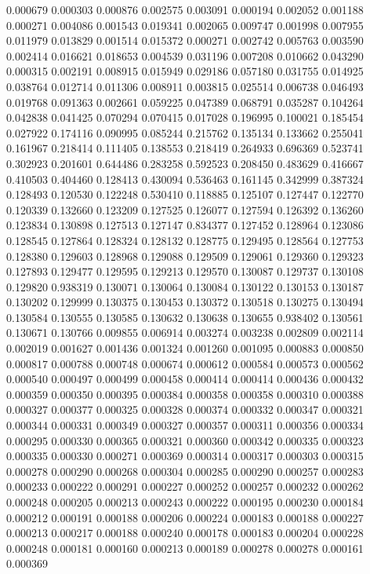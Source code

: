 0.000679
0.000303
0.000876
0.002575
0.003091
0.000194
0.002052
0.001188
0.000271
0.004086
0.001543
0.019341
0.002065
0.009747
0.001998
0.007955
0.011979
0.013829
0.001514
0.015372
0.000271
0.002742
0.005763
0.003590
0.002414
0.016621
0.018653
0.004539
0.031196
0.007208
0.010662
0.043290
0.000315
0.002191
0.008915
0.015949
0.029186
0.057180
0.031755
0.014925
0.038764
0.012714
0.011306
0.008911
0.003815
0.025514
0.006738
0.046493
0.019768
0.091363
0.002661
0.059225
0.047389
0.068791
0.035287
0.104264
0.042838
0.041425
0.070294
0.070415
0.017028
0.196995
0.100021
0.185454
0.027922
0.174116
0.090995
0.085244
0.215762
0.135134
0.133662
0.255041
0.161967
0.218414
0.111405
0.138553
0.218419
0.264933
0.696369
0.523741
0.302923
0.201601
0.644486
0.283258
0.592523
0.208450
0.483629
0.416667
0.410503
0.404460
0.128413
0.430094
0.536463
0.161145
0.342999
0.387324
0.128493
0.120530
0.122248
0.530410
0.118885
0.125107
0.127447
0.122770
0.120339
0.132660
0.123209
0.127525
0.126077
0.127594
0.126392
0.136260
0.123834
0.130898
0.127513
0.127147
0.834377
0.127452
0.128964
0.123086
0.128545
0.127864
0.128324
0.128132
0.128775
0.129495
0.128564
0.127753
0.128380
0.129603
0.128968
0.129088
0.129509
0.129061
0.129360
0.129323
0.127893
0.129477
0.129595
0.129213
0.129570
0.130087
0.129737
0.130108
0.129820
0.938319
0.130071
0.130064
0.130084
0.130122
0.130153
0.130187
0.130202
0.129999
0.130375
0.130453
0.130372
0.130518
0.130275
0.130494
0.130584
0.130555
0.130585
0.130632
0.130638
0.130655
0.938402
0.130561
0.130671
0.130766
0.009855
0.006914
0.003274
0.003238
0.002809
0.002114
0.002019
0.001627
0.001436
0.001324
0.001260
0.001095
0.000883
0.000850
0.000817
0.000788
0.000748
0.000674
0.000612
0.000584
0.000573
0.000562
0.000540
0.000497
0.000499
0.000458
0.000414
0.000414
0.000436
0.000432
0.000359
0.000350
0.000395
0.000384
0.000358
0.000358
0.000310
0.000388
0.000327
0.000377
0.000325
0.000328
0.000374
0.000332
0.000347
0.000321
0.000344
0.000331
0.000349
0.000327
0.000357
0.000311
0.000356
0.000334
0.000295
0.000330
0.000365
0.000321
0.000360
0.000342
0.000335
0.000323
0.000335
0.000330
0.000271
0.000369
0.000314
0.000317
0.000303
0.000315
0.000278
0.000290
0.000268
0.000304
0.000285
0.000290
0.000257
0.000283
0.000233
0.000222
0.000291
0.000227
0.000252
0.000257
0.000232
0.000262
0.000248
0.000205
0.000213
0.000243
0.000222
0.000195
0.000230
0.000184
0.000212
0.000191
0.000188
0.000206
0.000224
0.000183
0.000188
0.000227
0.000213
0.000217
0.000188
0.000240
0.000178
0.000183
0.000204
0.000228
0.000248
0.000181
0.000160
0.000213
0.000189
0.000278
0.000278
0.000161
0.000369
